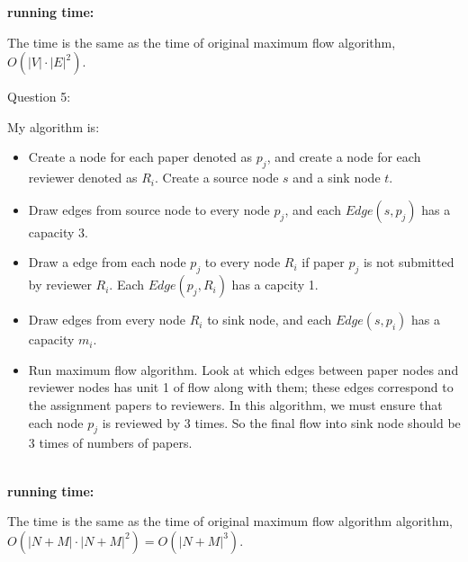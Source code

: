 \documentclass[12pt]{article}
\begin{document}
\textbf{running time:} \par
The time is the same as the time of original maximum flow algorithm, $O(|V|\cdot|E|^2)$.




\pagebreak
\noindent
\large Question 5: \par
\normalsize 
My algorithm is:
\begin{itemize}
  \item	Create a node for each paper denoted as $p_j$, and create a node for each reviewer denoted as $R_i$. Create a source node $s$ and a sink node $t$.
  \item Draw edges from source node to every node $p_j$, and each $Edge(s, p_j)$ has a capacity $3$. 
  \item Draw a edge from each node $p_j$ to every node $R_i$ if paper $p_j$ is not submitted by reviewer $R_i$.  
	Each $Edge(p_j, R_i)$ has a capcity 1. 
  \item Draw edges from every node $R_i$ to sink node, and each $Edge(s, p_i)$ has a capacity $m_i$.
  \item Run maximum flow algorithm. 
	Look at which edges between paper nodes and reviewer nodes has unit 1 of flow along with them; 
	these edges correspond to the assignment papers to reviewers.
	In this algorithm, we must ensure that each node $p_j$ is reviewed by 3 times. 
	So the final flow into sink node should be 3 times of numbers of papers.
\end{itemize}

\noindent \\
\textbf{running time:} \par
The time is the same as the time of original maximum flow algorithm algorithm, $O(|N + M|\cdot|N + M|^2) = O(|N + M|^3)$.
\end{document}
